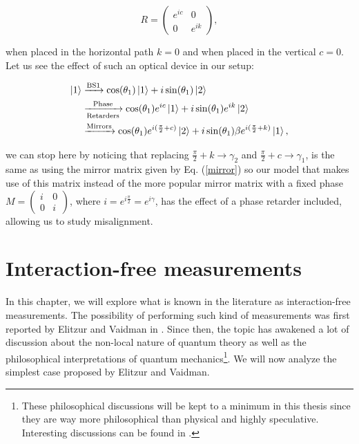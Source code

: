 \documentclass[12pt]{book}
\newcommand\blankpage{
    \null
    \thispagestyle{empty}
    \addtocounter{page}{0}
    \newpage
    }
\begin{document}
\begin{equation}
 R=\begin
{pmatrix} e^
{i c} & 0\\0& e^
{i k }\end
{pmatrix},
\end{equation}

when placed in the horizontal path $k=0$ and when placed in the vertical $c=0$. Let us see the effect of such an optical device in our setup:

\begin{align*}
\ket{1}&\xrightarrow{\text{BS1}}\cos(\theta_{1})\ket{1}+i\sin(\theta_{1})\ket{2}\\ &\xrightarrow[\text{Retarders}]{\text{Phase}}\cos(\theta_{1})e^{ic}\ket{1}+i\sin(\theta_{1}) e^{ik}\ket{2} \\ &\xrightarrow{\text{Mirrors}} \cos(\theta_{1})e^{i(\frac{\pi}{2}+c)}\ket{2}+i\sin(\theta_{1})\beta e^{i(\frac{\pi}{2}+k)}\ket{1},
\end{align*}

we can stop here by noticing that replacing $\frac{\pi}{2}+k\xrightarrow{}\gamma_{2}$ and  $\frac{\pi}{2}+c\xrightarrow{}\gamma_{1}$,  is the same as using the mirror matrix given by Eq. (\ref{mirror}) so our model that makes use of this matrix  instead of the more popular mirror matrix with a fixed phase $M=\begin{pmatrix} i & 0\\0& i\end{pmatrix}$, where $i=e^{i \frac{\pi}{2}}=e^{i\gamma}$, has the  effect of a phase retarder included, allowing us to study misalignment. 

\afterpage{\blankpage}

\chapter{ Interaction-free  measurements}


In this chapter, we will explore what is known in the literature as interaction-free measurements. The possibility of performing such kind of measurements was first reported by Elitzur and Vaidman in \cite{Elitzur}. Since then, the topic has awakened a lot of discussion about the non-local nature of quantum theory as well as the philosophical interpretations of quantum mechanics\footnote{ These philosophical discussions will be kept to a minimum in this thesis since they are way more philosophical than physical and highly speculative. Interesting discussions can be found in \cite{paper_vaidman, maudlin}. }. We will now analyze the simplest case proposed by Elitzur and Vaidman.
\end{document}
